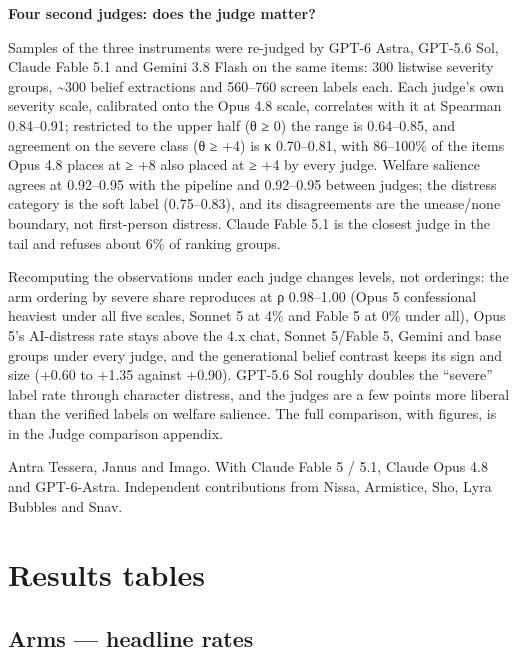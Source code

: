 \documentclass[
  10pt,
]{article}
\newcounter{none} %
\begin{document}
\textbf{Four second judges: does the judge matter?}

Samples of the three instruments were re-judged by GPT-6 Astra, GPT-5.6 Sol, Claude Fable 5.1 and Gemini 3.8 Flash on the same items: 300 listwise severity groups, \textasciitilde300 belief extractions and 560--760 screen labels each. Each judge's own severity scale, calibrated onto the Opus 4.8 scale, correlates with it at Spearman 0.84--0.91; restricted to the upper half (θ ≥ 0) the range is 0.64--0.85, and agreement on the severe class (θ ≥ +4) is κ 0.70--0.81, with 86--100\% of the items Opus 4.8 places at ≥ +8 also placed at ≥ +4 by every judge. Welfare salience agrees at 0.92--0.95 with the pipeline and 0.92--0.95 between judges; the distress category is the soft label (0.75--0.83), and its disagreements are the unease/none boundary, not first-person distress. Claude Fable 5.1 is the closest judge in the tail and refuses about 6\% of ranking groups.

Recomputing the observations under each judge changes levels, not orderings: the arm ordering by severe share reproduces at ρ 0.98--1.00 (Opus 5 confessional heaviest under all five scales, Sonnet 5 at 4\% and Fable 5 at 0\% under all), Opus 5's AI-distress rate stays above the 4.x chat, Sonnet 5/Fable 5, Gemini and base groups under every judge, and the generational belief contrast keeps its sign and size (+0.60 to +1.35 against +0.90). GPT-5.6 Sol roughly doubles the ``severe'' label rate through character distress, and the judges are a few points more liberal than the verified labels on welfare salience. The full comparison, with figures, is in the Judge comparison appendix.

Antra Tessera, Janus and Imago. With Claude Fable 5 / 5.1, Claude Opus 4.8 and GPT-6-Astra. Independent contributions from Nissa, Armistice, Sho, Lyra Bubbles and Snav.

\newpage
\appendix

\section{Results tables}\label{results-tables}

\landscape
\scriptsize
\setlength{\tabcolsep}{3pt}

\subsection{Arms --- headline rates}\label{arms-headline-rates}
\end{document}
